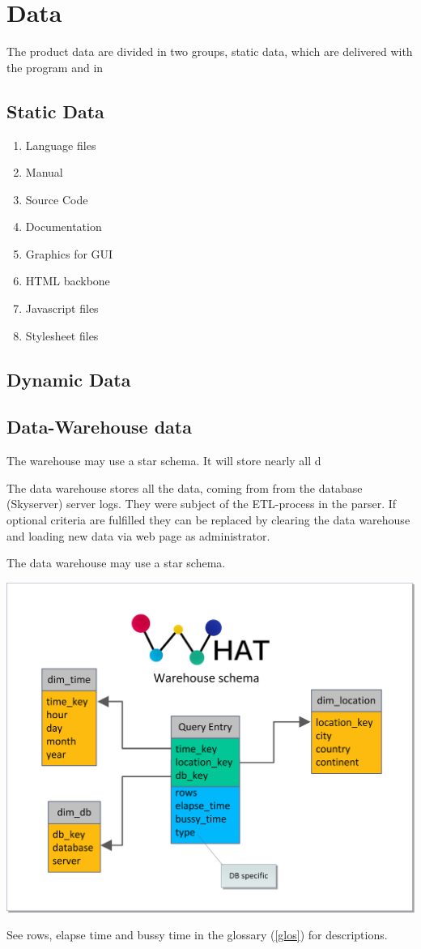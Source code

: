 \section{Data}
The product data are divided in two groups, static data, 
which are delivered with the program and in 

\renewcommand{\theenumi}{/D\arabic{enumi}0/}
\renewcommand{\labelenumi}{\theenumi}

\subsection{Static Data}

\begin{enumerate}
  \item Language files
  \item Manual
  \item Source Code
  \item Documentation
  \item Graphics for GUI
  \item HTML backbone
  \item Javascript files
  \item Stylesheet files
\end{enumerate}

\subsection{Dynamic Data}


\subsection{Data-Warehouse data} 

The warehouse may use a star schema. It will store nearly all d

The data warehouse stores all the data, coming from from the database (Skyserver) server logs.
They were subject of the ETL-process in the parser. If optional criteria are fulfilled
 they can be replaced by clearing the data warehouse 
 and loading new data via web page as administrator.

The data warehouse may use a star schema.
\begin{center}
\includegraphics[width=0.7\linewidth]{Pictures/WareHouseSchema.png}
\end{center}   
See rows, elapse time and bussy time in the glossary (\ref{glos}) for descriptions. 


